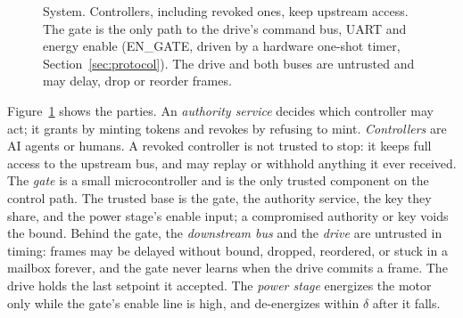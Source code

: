 \documentclass[letterpaper]{article} %
\begin{document}
\begin{figure}[t]
\centering
{}
\caption{System. Controllers, including revoked ones, keep upstream access. The gate is the only
path to the drive's command bus, UART and energy enable (EN\_GATE, driven by a hardware one-shot
timer, Section~\ref{sec:protocol}). The drive and both buses are untrusted and may delay, drop or
reorder frames.}
\label{fig:system}
\end{figure}

Figure~\ref{fig:system} shows the parties. An \emph{authority service} decides which controller
may act; it grants by minting tokens and revokes by refusing to mint. \emph{Controllers} are AI
agents or humans. A revoked controller is not trusted to stop: it keeps full access to the
upstream bus, and may replay or withhold anything it ever received. The \emph{gate} is a small
microcontroller and is the only trusted component on the control path. The trusted base is the
gate, the authority service, the key they share, and the power stage's enable input; a
compromised authority or key voids the bound. Behind the gate, the
\emph{downstream bus} and the \emph{drive} are untrusted in timing: frames may be delayed without
bound, dropped, reordered, or stuck in a mailbox forever, and the gate never learns when the drive
commits a frame. The drive holds the last setpoint it accepted. The \emph{power stage} energizes
the motor only while the gate's enable line is high, and de-energizes within $\delta$ after it
falls.
\end{document}

